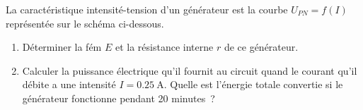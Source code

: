 La caractéristique intensité-tension d’un générateur est la courbe
$U_{PN}=f(I)$ représentée sur le schéma ci-dessous.

\begin{figure}[H]
    \centering
\end{figure}

\begin{enumerate}
    \item Déterminer la fém $E$ et la résistance interne $r$ de ce
          générateur.
    \item Calculer la puissance électrique qu'il fournit au circuit quand le
          courant qu'il débite a une intensité $I=\qty{0,25}{\ampere}$.
          Quelle est l'énergie totale convertie si le générateur fonctionne
          pendant 20 minutes~?
\end{enumerate}



